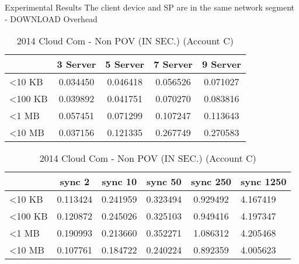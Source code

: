 \begin{frame}{Experimental Results}
{The client device and SP are in the same network segment - DOWNLOAD Overhead}
	\scriptsize
    \begin{table}[]
    \centering
    \caption{My Method - Non POV (IN SEC.) (Account C)}
    \begin{tabular}{lcccc}
       					 & 3 Server & 5 Server & 7 Server & 9 Server \\ \hline
        \textless 10 KB  & 0.034450 & 0.046418 & 0.056526 & 0.071027 \\ \hline
        \textless 100 KB & 0.039892 & 0.041751 & 0.070270 & 0.083816 \\ \hline
        \textless 1 MB   & 0.057451 & 0.071299 & 0.107247 & 0.113643 \\ \hline
        \textless 10 MB  & 0.037156 & 0.121335 & 0.267749 & 0.270583 \\ \hline
    \end{tabular}
    \caption{2014 Cloud Com - Non POV (IN SEC.) (Account C)}
    \begin{tabular}{lccccl}
       					 & sync 2   & sync 10  & sync 50  & sync 250 & sync 1250 \\ \hline
        \textless 10 KB  & 0.113424 & 0.241959 & 0.323494 & 0.929492 & 4.167419  \\ \hline
        \textless 100 KB & 0.120872 & 0.245026 & 0.325103 & 0.949416 & 4.197347  \\ \hline
        \textless 1 MB   & 0.190993 & 0.213660 & 0.352271 & 1.086312 & 4.205468  \\ \hline
        \textless 10 MB  & 0.107761 & 0.184722 & 0.240224 & 0.892359 & 4.005623  \\ \hline
    \end{tabular}
    \end{table}
\end{frame}

